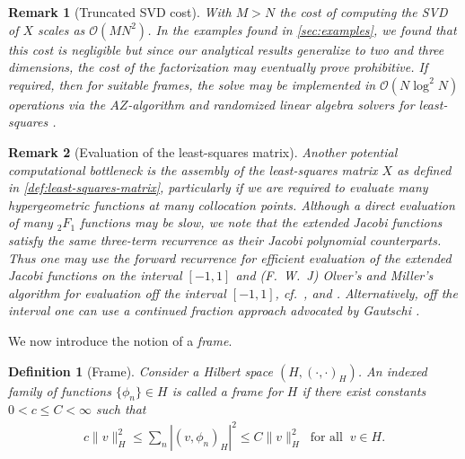 \documentclass[10pt,a4paper]{article}
\newtheorem{definition}{Definition}[section]
\newtheorem{remark}{Remark}[section]
\numberwithin{equation}{section}
\begin{document}
\begin{remark}[Truncated SVD cost]
With $M>N$ the cost of computing the SVD of $X$ scales as $\mathcal{O}(MN^2)$. In the examples found in \cref{sec:examples}, we found that this cost is negligible but since our analytical results generalize to two and three dimensions, the cost of the factorization may eventually prove prohibitive. If required, then for suitable frames, the solve may be implemented in $\mathcal{O}(N\log^2 N)$ operations via the $AZ$-algorithm \cite{Coppe2020} and randomized linear algebra solvers for least-squares \cite{Halko2011, Meier2022, Meier2023}.
\end{remark}


\begin{remark}[Evaluation of the least-squares matrix]
Another potential computational bottleneck is the assembly of the least-squares matrix $X$ as defined in \cref{def:least-squares-matrix}, particularly if we are required to evaluate many hypergeometric functions at many collocation points. Although a direct evaluation of many ${_2}F_1$ functions may be slow, we note that the extended Jacobi functions satisfy the same three-term recurrence as their Jacobi polynomial counterparts. Thus one may use the forward recurrence for efficient evaluation of the extended Jacobi functions on the interval $[-1,1]$ and (F.~W.~J) Olver's and Miller's algorithm for evaluation off the interval $[-1,1]$, cf.~\cite[Sec.~2.3]{Gautschi2004}, \cite[Sec.~3.6]{OlverNIST} and \cite[App.~B]{Olver2019}. Alternatively, off the interval one can use a continued fraction approach advocated by Gautschi \cite{Gautschi1981}.
\end{remark}


We now introduce the notion of a \emph{frame}.
\begin{definition}[Frame]
Consider a Hilbert space $(H, (\cdot,\cdot)_H)$. An indexed family of functions $\{\phi_n\} \in H$ is called a \emph{frame} for $H$ if there exist constants $0 < c \leq C < \infty$ such that
\begin{align}
c\| v \|^2_H \leq \sum_n |( v, \phi_n )_H |^2 \leq C \|v \|^2_H \;\; \text{for all} \; \; v \in H.
\label{ineq:frame-condition}
\end{align}
\end{definition}
\end{document}
